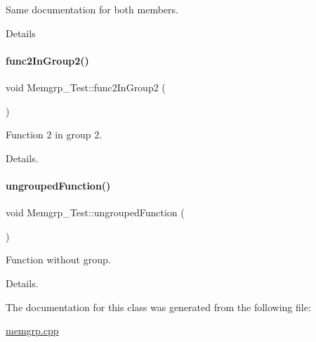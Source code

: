 Same documentation for both members. 

Details \mbox{\label{class_memgrp___test_a9ce862049bb543596343e81ad3ddddff}} 
\paragraph{\texorpdfstring{func2InGroup2()}{func2InGroup2()}}
{\footnotesize\ttfamily void Memgrp\+\_\+\+Test\+::func2\+In\+Group2 (\begin{DoxyParamCaption}{ }\end{DoxyParamCaption})\hspace{0.3cm}{\ttfamily [protected]}}



Function 2 in group 2. 

Details. \mbox{\label{class_memgrp___test_a8a3a4ac34b2e25696159ac420bd4bdc6}} 
\paragraph{\texorpdfstring{ungroupedFunction()}{ungroupedFunction()}}
{\footnotesize\ttfamily void Memgrp\+\_\+\+Test\+::ungrouped\+Function (\begin{DoxyParamCaption}{ }\end{DoxyParamCaption})}



Function without group. 

Details. 

The documentation for this class was generated from the following file\+:\begin{DoxyCompactItemize}
\item 
\mbox{\hyperlink{memgrp_8cpp}{memgrp.\+cpp}}\end{DoxyCompactItemize}

